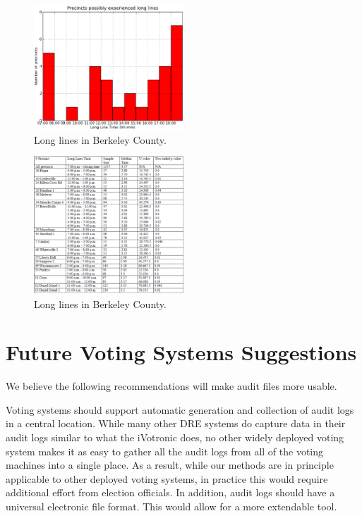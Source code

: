 \documentclass[letterpaper,twocolumn,10pt]{article}
\begin{document}
\begin{figure}[htbp]
\begin{center}
    \includegraphics[width=0.5\textwidth,height=0.3\textheight]{berkeleyLongLine.eps}
\end{center}
\caption{Long lines in Berkeley County.}
\label{fig:long-lines}
\end{figure}

\begin{figure}[htbp]
\begin{center}
    \includegraphics[width=0.5\textwidth,height=0.4\textheight]{berkeleyLongLineTable.eps}
\end{center}
\caption{Long lines in Berkeley County.}
\label{fig:mann-whitney-u}
\end{figure}

\section{Future Voting Systems Suggestions}
\label{sec:suggestions}
We believe the following recommendations will make audit files more usable. 

Voting systems should support automatic generation and collection of audit logs 
in a central location.  While many other DRE systems do capture data in their audit logs similar to what
the iVotronic does, no other widely deployed voting system makes it as easy to
gather all the audit logs from all of the voting machines into a single
place. As a result, while our methods are in principle applicable to other
deployed voting systems, in practice this would require additional effort from
election officials. 
 In addition, audit logs should have a universal 
electronic file format.  This would allow for a more extendable tool.
\end{document}
